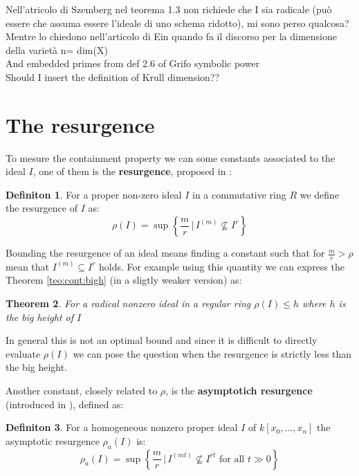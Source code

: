 \documentclass[]{book}
\theoremstyle{plain}
\newtheorem{teo}{Theorem}[section]
\theoremstyle{remark}
\theoremstyle{definition}
\newtheorem{deff}[teo]{Definiton}
\newcommand{\cont}[2]{ I^{(#1)} \subseteq I^{#2}}
\begin{document}
	 
	\begin{tboxque}
		Nell'atricolo di Szemberg nel teorema 1.3 non richiede che I sia radicale (può essere che assuma essere l'ideale di uno schema ridotto), mi sono perso qualcosa? Mentre lo chiedono nell'articolo di Ein quando fa il discorso per la dimensione della varietà n= dim(X)\\
		And embedded primes from def 2.6 of Grifo symbolic power\\
		Should I insert the definition of Krull dimension??
	\end{tboxque}
	

\section{The resurgence}
To mesure the containment property we can some constants associated to the ideal $ I $, one of them is the \textbf{resurgence}, proposed in \cite{Boc09resurgence}:
\begin{deff}
	For a proper non-zero ideal $ I $ in a commutative ring $ R $ we define the resurgence of $ I $ as:
	\begin{equation*}
		\rho(I)= \sup \left\lbrace \frac{m}{r} \, | \, I^{(m)} \not \subseteq I^r \right\rbrace 
	\end{equation*}
\end{deff}
Bounding the resurgence of an ideal means finding a constant such that for $ \frac{m}{r} > \rho $ mean that $ \cont{m}{r} $ holds.
For example using this quantity we can express the Theorem \ref{teo:cont:bigh} (in a sligtly weaker version) as:
\begin{teo}
	For a radical nonzero ideal in a regular ring $ \rho(I) \leq h $ where $ h $ is the big height of $ I $
\end{teo}
In general this is not an optimal bound and since it is difficult to directly evaluate $ \rho(I) $ we can pose the question when the resurgence is strictly less than the big height. 

Another constant, closely related to $ \rho $, is the \textbf{asymptotich resurgence} (introduced in \cite{Guardo2012}), defined as:
\begin{deff}
	For a homogeneous nonzero proper ideal $ I $ of $ k[x_0 , ... , x_n] $ the asymptotic resurgence $ \rho_a(I) $ is:
	\[ \rho_a(I) = \sup \left\lbrace \frac{m}{r} \, | \, I^{(mt)} \not \subseteq I^{rt} \text{ for all } t \gg 0 \right\rbrace \]
\end{deff}
\end{document}
